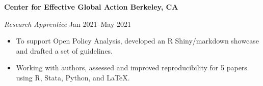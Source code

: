 \textbf{Center for Effective Global Action \hfill Berkeley, CA}\par

\textit{Research Apprentice} \hfill Jan 2021--May 2021
\begin{itemize}
	\item To support Open Policy Analysis, developed an R Shiny/markdown showcase and drafted a set of guidelines.
	\item Working with authors, assessed and improved reproducibility for 5 papers using R, Stata, Python, and \LaTeX.
\end{itemize}\par